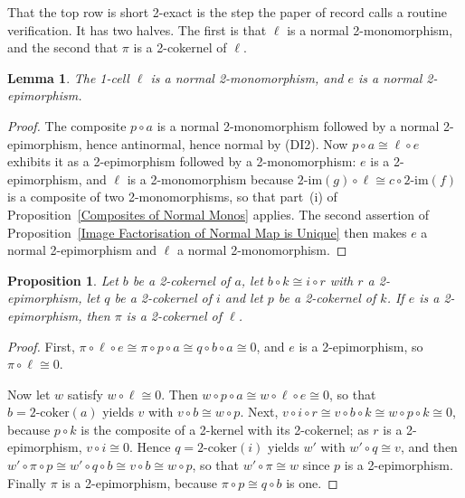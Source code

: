 \documentclass[reqno,a4paper]{amsart}
\numberwithin{equation}{section}
\theoremstyle{plain}
\newtheorem{proposition}[subsection]{Proposition}
\newtheorem{lemma}[subsection]{Lemma}
\theoremstyle{definition}
\def\nameit#1{\textrm{#1}~}
\def\prox{\nameit{Proposition}}
\newcommand{\comp}{\circ}
\newcommand{\iso}{\cong}
\renewcommand{\1}{\onecat{1}}
\newcommand{\twocoker}{\ensuremath{2\text{-}\mathrm{coker}}}
\newcommand{\twoimg}{\ensuremath{2\text{-}\mathrm{im}}}
\begin{document}
That the top row is short 2-exact is the step the paper of record calls a routine verification. It has two halves. The first is that \(\ell\) is a normal 2-monomorphism, and the second that \(\pi\) is a 2-cokernel of \(\ell\).

\begin{lemma}\label{L:ImgMapNormal}
	The 1-cell \(\ell\) is a normal 2-monomorphism, and \(e\) is a normal 2-epimorphism.
\end{lemma}
\begin{proof}
	The composite \(p\comp a\) is a normal 2-monomorphism followed by a normal 2-epimorphism, hence antinormal, hence normal by \textup{(DI2)}. Now \(p\comp a\iso\ell\comp e\) exhibits it as a 2-epimorphism followed by a 2-monomorphism: \(e\) is a 2-epimorphism, and \(\ell\) is a 2-monomorphism because \(\twoimg(g)\comp\ell\iso c\comp\twoimg(f)\) is a composite of two 2-monomorphisms, so that part~\textup{(i)} of \prox\ref{Composites of Normal Monos} applies. The second assertion of \prox\ref{Image Factorisation of Normal Map is Unique} then makes \(e\) a normal 2-epimorphism and \(\ell\) a normal 2-monomorphism.
\end{proof}

\begin{proposition}\label{P:RoutineVerification}
	Let \(b\) be a 2-cokernel of \(a\), let \(b\comp k\iso i\comp r\) with \(r\) a 2-epimorphism, let \(q\) be a 2-cokernel of \(i\) and let \(p\) be a 2-cokernel of \(k\). If \(e\) is a 2-epimorphism, then \(\pi\) is a 2-cokernel of \(\ell\).
\end{proposition}
\begin{proof}
	First, \(\pi\comp\ell\comp e\iso\pi\comp p\comp a\iso q\comp b\comp a\iso 0\), and \(e\) is a 2-epimorphism, so \(\pi\comp\ell\iso 0\).

	Now let \(w\) satisfy \(w\comp\ell\iso 0\). Then \(w\comp p\comp a\iso w\comp\ell\comp e\iso 0\), so that \(b=\twocoker(a)\) yields \(v\) with \(v\comp b\iso w\comp p\). Next, \(v\comp i\comp r\iso v\comp b\comp k\iso w\comp p\comp k\iso 0\), because \(p\comp k\) is the composite of a 2-kernel with its 2-cokernel; as \(r\) is a 2-epimorphism, \(v\comp i\iso 0\). Hence \(q=\twocoker(i)\) yields \(w'\) with \(w'\comp q\iso v\), and then \(w'\comp\pi\comp p\iso w'\comp q\comp b\iso v\comp b\iso w\comp p\), so that \(w'\comp\pi\iso w\) since \(p\) is a 2-epimorphism. Finally \(\pi\) is a 2-epimorphism, because \(\pi\comp p\iso q\comp b\) is one.
\end{proof}
\end{document}
